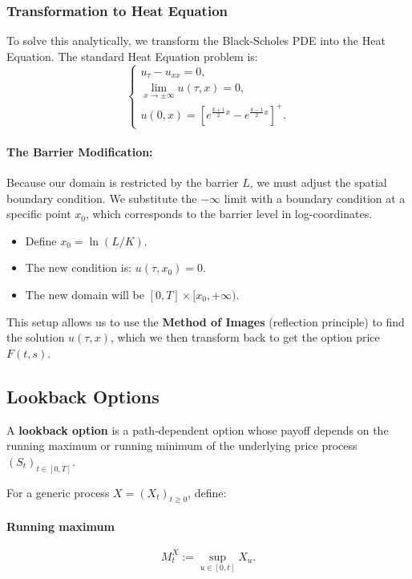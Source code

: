\documentclass[12pt,a4paper]{article}
\theoremstyle{definition}
\begin{document}
\subsubsection{Transformation to Heat Equation}

To solve this analytically, we transform the Black-Scholes PDE into the Heat Equation. The standard Heat Equation problem is:
\[
\begin{cases}
u_\tau - u_{xx} = 0, \\
\lim_{x \to \pm\infty} u(\tau, x) = 0, \\
u(0, x) = \left[e^{\frac{k+1}{2}x} - e^{\frac{k-1}{2}x}\right]^+.
\end{cases}
\]

\paragraph{The Barrier Modification:}

Because our domain is restricted by the barrier $L$, we must adjust the spatial boundary condition. We substitute the $-\infty$ limit with a boundary condition at a specific point $x_0$, which corresponds to the barrier level in log-coordinates.

\begin{itemize}
\item Define $x_0 = \ln(L/K)$.
\item The new condition is: $u(\tau, x_0) = 0$.
\item The new domain will be $[0, T] \times [x_0, +\infty)$.
\end{itemize}

This setup allows us to use the \textbf{Method of Images} (reflection principle) to find the solution $u(\tau, x)$, which we then transform back to get the option price $F(t, s)$.

\subsection{Lookback Options}

A \textbf{lookback option} is a path-dependent option whose payoff depends on the running maximum or running minimum of the underlying price process $(S_t)_{t \in [0,T]}$.

For a generic process $X = (X_t)_{t \geq 0}$, define:

\paragraph{Running maximum}
\[
M_t^X := \sup_{u \in [0,t]} X_u.
\]
\end{document}
